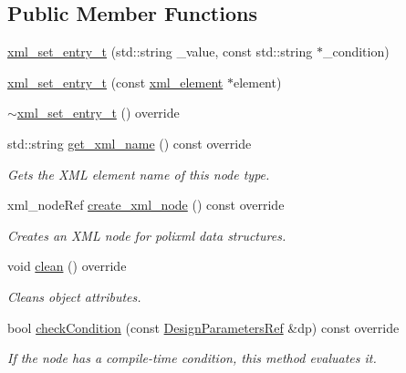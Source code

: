 \subsection*{Public Member Functions}
\begin{DoxyCompactItemize}
\item 
\hyperlink{classxml__set__entry__t_af48daac83f7a26fb95dcf3fd8cc72d34}{xml\+\_\+set\+\_\+entry\+\_\+t} (std\+::string \+\_\+value, const std\+::string $\ast$\+\_\+condition)
\item 
\hyperlink{classxml__set__entry__t_a7e28ace09855210ec6e9d0f91815beb6}{xml\+\_\+set\+\_\+entry\+\_\+t} (const \hyperlink{classxml__element}{xml\+\_\+element} $\ast$element)
\item 
\hyperlink{classxml__set__entry__t_aea02ff0324bf8b342184969c935bf54f}{$\sim$xml\+\_\+set\+\_\+entry\+\_\+t} () override
\item 
std\+::string \hyperlink{classxml__set__entry__t_a0a526ef7f3872e92b59a6f961b3383cf}{get\+\_\+xml\+\_\+name} () const override
\begin{DoxyCompactList}\small\item\em Gets the X\+ML element name of this node type. \end{DoxyCompactList}\item 
xml\+\_\+node\+Ref \hyperlink{classxml__set__entry__t_ac1b86d13e93d6fb01ace81a603cede2a}{create\+\_\+xml\+\_\+node} () const override
\begin{DoxyCompactList}\small\item\em Creates an X\+ML node for polixml data structures. \end{DoxyCompactList}\item 
void \hyperlink{classxml__set__entry__t_ac996d3a7900d2deceeee5efcea48bb3a}{clean} () override
\begin{DoxyCompactList}\small\item\em Cleans object attributes. \end{DoxyCompactList}\item 
bool \hyperlink{classxml__set__entry__t_a85ffc00f525e4b5425f60c2908d1bd83}{check\+Condition} (const \hyperlink{DesignParameters_8hpp_ae36bb1c4c9150d0eeecfe1f96f42d157}{Design\+Parameters\+Ref} \&dp) const override
\begin{DoxyCompactList}\small\item\em If the node has a compile-\/time condition, this method evaluates it. \end{DoxyCompactList}\end{DoxyCompactItemize}
